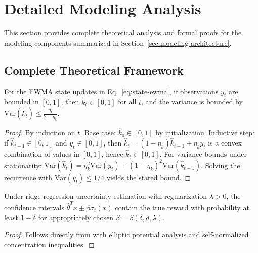 \appendix

\section{Detailed Modeling Analysis}
\label{app:modeling-details}

This section provides complete theoretical analysis and formal proofs for the modeling components summarized in Section~\ref{sec:modeling-architecture}.

\subsection{Complete Theoretical Framework}

\begin{lemma}
\label{lem:ewma}
For the EWMA state updates in Eq.~\eqref{eq:state-ewma}, if observations $y_t$ are bounded in $[0,1]$, then $\widehat{k}_t \in [0,1]$ for all $t$, and the variance is bounded by $\text{Var}(\widehat{k}_t) \leq \frac{\eta_k}{2-\eta_k}$.
\end{lemma}

\begin{proof}
By induction on $t$. Base case: $\widehat{k}_0 \in [0,1]$ by initialization. Inductive step: if $\widehat{k}_{t-1} \in [0,1]$ and $y_t \in [0,1]$, then $\widehat{k}_t = (1-\eta_k)\widehat{k}_{t-1} + \eta_k y_t$ is a convex combination of values in $[0,1]$, hence $\widehat{k}_t \in [0,1]$. For variance bounds under stationarity: $\text{Var}(\widehat{k}_t) = \eta_k^2 \text{Var}(y_t) + (1-\eta_k)^2 \text{Var}(\widehat{k}_{t-1})$. Solving the recurrence with $\text{Var}(y_t) \leq 1/4$ yields the stated bound.
\end{proof}

\begin{lemma}
\label{lem:hoeffding}
Under ridge regression uncertainty estimation with regularization $\lambda > 0$, the confidence intervals $\hat{\theta}^T x \pm \beta \sigma_t(x)$ contain the true reward with probability at least $1-\delta$ for appropriately chosen $\beta = \beta(\delta, d, \lambda)$.
\end{lemma}

\begin{proof}
Follows directly from \cite{Abbasi2011} with elliptic potential analysis and self-normalized concentration inequalities.
\end{proof}

